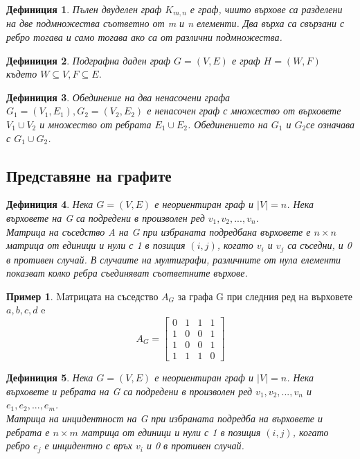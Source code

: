 \documentclass[fleqn, 12pt]{article}
\newtheorem{definition}{Дефиниция}[subsection]
\theoremstyle{definition}
\newtheorem{example}{Пример}[subsection]
\begin{document}
\begin{definition}
Пълен двуделен граф $K_{m,n}$ е граф, чиито върхове са разделени на две подмножества съответно от m и n елементи. Два върха са свързани с ребро тогава и само тогава ако са от различни подмножества.
\end{definition}
\begin{definition}
Подграфна даден граф $G = (V, E)$ е граф $H = (W, F)$ където $W \subseteq V, F \subseteq E$.
\end{definition}
\begin{definition}
Обединение на два ненасочени графа $G_1= (V_1, E_1), G_2= (V_2, E_2)$ е ненасочен граф с множество от върховете $V_1\cup V_2 $ и множество от ребрата $E_1 \cup E_2$. Обединението на $G_1$ и $G_2$се означава с $G_1\cup G_2$.
\end{definition}
\subsection{Представяне на графите}
\begin{definition}
Нека $G = (V, E)$ е неориентиран граф и $\vert V \vert = n$. Нека върховете на G са подредени в произволен ред $v_1, v_2, ..., v_n$. \\
Матрица на съседство A  на G при избраната подредбана върховете е $n \times n$ матрица от единици и нули с 1 в позиция $(i, j)$, когато $v_i$ и $v_j$ са съседни, и 0 в противен случай. В случаите на мултиграфи, различните от нула елементи показват колко ребра съединяват съответните върхове.
\end{definition}
\begin{example}
Mатрицата на съседство $A_G$ за графа G при следния ред на върховете $a, b, c, d$ e \\
$$A_G = 
\begin{bmatrix}
0 & 1 & 1 & 1\\
1 & 0 & 0 & 1\\
1 & 0 & 0 & 1 \\
1 & 1 & 1 & 0
\end{bmatrix}
$$
\end{example}

\begin{definition}
Нека $G = (V, E)$ е неориентиран граф и $\vert V \vert = n$. Нека върховете и ребрата на G са подредени в произволен ред $v_1, v_2, ..., v_n$ и $e_1,e_2, ..., e_m$. \\
Матрица на инцидентност на G при избраната подредба на върховете и ребрата е $n \times m$ матрица от единици и нули с 1 в позиция $(i, j)$, когато ребро $e_j$ е инцидентно с връх $v_i$ и 0 в противен случай.
\end{definition}
\end{document}
